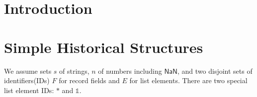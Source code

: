 \documentclass[english,submission]{programming}
\newcommand{\mathbox}[1]{\colorbox{black!10}{$#1$}}
\begin{document}
\section{Introduction}




\section{Simple Historical Structures}

We assume sets \mathbox{s} of strings, \mathbox{n} of numbers including \mathbox{\textsf{NaN}}, and two disjoint sets of identifiers(IDs) \mathbox{F} for record fields and \mathbox{E} for list elements. There are two special list element IDs: \mathbox{*} and \mathbox{\mathbb{1}}.

\tcbox{
\[ \begin{array}{rl|rl|rl|l}
  \multicolumn{2}{l|}{\textrm{type}} & \multicolumn{2}{l|}{\textrm{value}} & \multicolumn{2}{l|}{\textrm{initial value}}&\\
  \hline
  \textsf{T} \Coloneqq & & \textsf{v} \Coloneqq & & \textsf{T}^\varnothing = & &\\
  &  \textsf{String} & & s & & \textsf{\textquotedbl\ \!\textquotedbl} & \textrm{string}\\
  & \textsf{Number} & &  n & & \textsf{NaN} & \textrm{number}\\
  & \textsf{List T} & & [ E : \textsf{v} \  \dots ] & & [] & \textrm{list}\\
  & \{ F \  s : \textsf{T} \  \dots \} & & \{ F : \textsf{v} \  \dots \} & &
  \{ F : \textsf{T}^\varnothing \  \dots \}& \textrm{record}\\

  & \bot && \bigtimes & & \bigtimes & \textrm{tombstone}\\
\end{array}\]
}
\end{document}
